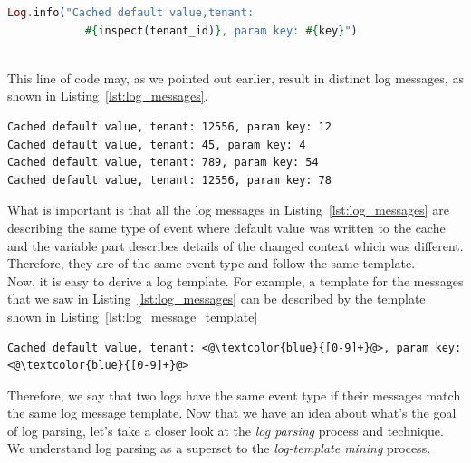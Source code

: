 \begin{lstlisting}[language=elixir, caption={Example of how logging is done in source code}, captionpos=b, label={lst:logging_code}]
Log.info("Cached default value,tenant: 
            #{inspect(tenant_id)}, param key: #{key}")
\end{lstlisting}
\\

This line of code may, as we pointed out earlier, result in distinct log messages, as shown in Listing~\ref{lst:log_messages}.\\

\begin{lstlisting}[label={lst:log_messages}, caption={Possible outputs of the code in Listing~\ref{lst:logging_code}}, captionpos=b]
Cached default value, tenant: 12556, param key: 12
Cached default value, tenant: 45, param key: 4
Cached default value, tenant: 789, param key: 54
Cached default value, tenant: 12556, param key: 78
\end{lstlisting}

What is important is that all the log messages in Listing~\ref{lst:log_messages} are describing the same type of event where default value was written to the cache and the variable part describes details of the changed context which was different. Therefore, they are of the same event type and follow the same template. \\

Now, it is easy to derive a log template. For example, a template for the messages that we saw in Listing~\ref{lst:log_messages} can be described by the template shown in Listing~\ref{lst:log_message_template}\\

\begin{lstlisting}[label={lst:log_message_template}, caption={Template for log messages in Listing ~\ref{lst:log_messages}, regular expressions are denoted in blue.}, captionpos=b]
Cached default value, tenant: <@\textcolor{blue}{[0-9]+}@>, param key: <@\textcolor{blue}{[0-9]+}@> 
\end{lstlisting}

Therefore, we say that two logs have the same event type if their messages match the same log message template. Now that we have an idea about what's the goal of log parsing, let's take a closer look at the \textit{log parsing} process and technique. We understand log parsing as a superset to the \textit{log-template mining} process. \\

